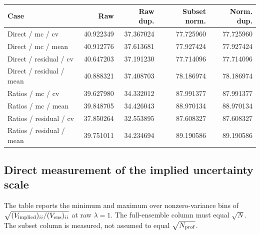 \begin{center}\small\begin{tabular}{lrrrr}\toprule

Case & Raw & Raw dup. & Subset norm. & Norm. dup.\\\midrule

Direct / mc / cv & 40.922349 & 37.367024 & 77.725960 & 77.725960\\

Direct / mc / mean & 40.912776 & 37.613681 & 77.927424 & 77.927424\\

Direct / residual / cv & 40.647203 & 37.191230 & 77.714096 & 77.714096\\

Direct / residual / mean & 40.888321 & 37.408703 & 78.186974 & 78.186974\\

Ratios / mc / cv & 39.627980 & 34.332012 & 87.991377 & 87.991377\\

Ratios / mc / mean & 39.848705 & 34.426043 & 88.970134 & 88.970134\\

Ratios / residual / cv & 37.850264 & 32.553895 & 87.608327 & 87.608327\\

Ratios / residual / mean & 39.751011 & 34.234694 & 89.190586 & 89.190586\\

\bottomrule\end{tabular}\end{center}

\subsection{Direct measurement of the implied uncertainty scale}

The table reports the minimum and maximum over nonzero-variance bins of $\sqrt{(V_{\rm implied})_{ii}/(V_{\rm ens})_{ii}}$ at raw $\lambda=1$. The full-ensemble column must equal $\sqrt{N}$. The subset column is measured, not assumed to equal $\sqrt{N_{\rm prof}}$.

